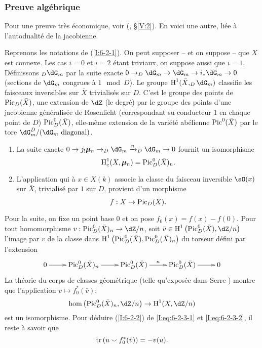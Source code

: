 \subsubsection{Preuve algébrique}\label{I:6-2-3}

Pour une preuve très économique, voir (, \S\ref{V:2}). 
En voici une autre, liée à l'autodualité de la jacobienne. 

Reprenons les notations de (\ref{I:6-2-1}). On peut supposer -- et on suppose -- 
que $X$ est connexe. Les cas $i=0$ et $i=2$ étant triviaux, on suppose aussi 
que $i=1$. Définissons $_D\dG_m$ par la suite exacte 
$0\to _D\dG_m \to \dG_m \to i_*\dG_m\to 0$ (sections de $\dG_m$ congrues à 
$1\mod D$). Le groupe $\h^1(\bar X, _D\dG_m)$ classifie les faisceaux 
inversibles sur $\bar X$ trivialisés sur $D$. C'est le groupe des points de 
$\operatorname{Pic}_D(\bar X)$, une extension de $\dZ$ (le degré) par le groupe des points 
d'une jacobienne généralisée de Rosenlicht (correspondant su conducteur 
$1$ en chaque point de $D$) $\operatorname{Pic}_D^0(\bar X)$, elle-même extension de la 
variété abélienne $\operatorname{Pic}^0(\bar X)$ par le tore 
$\dG_m^D/(\text{$\dG_m$ diagonal})$. 

\begin{enumerate}[\indent a)]
  \item La suite exacte 
    $0\to j_!\dmu_n \to _D\dG_m \xrightarrow{n} _D\dG_m\to 0$ fournit un 
    isomorphisme 
    \begin{equation}\label{I:eq:6-2-3-1}
      \operatorname{H}_c^1(X,{\bm\mu}_n) = \operatorname{Pic}_D^0(\bar X)_n \text{.}
    \end{equation}
  \item L'application qui à $x\in X(k)$ associe la classe du faisceau 
    inversible $\sO(x)$ sur $\bar X$, trivialisé par $1$ sur $D$, provient 
    d'un morphisme 
    \[
      f:X \to \operatorname{Pic}_D(\bar X) \text{.}
    \]
\end{enumerate}
Pour la suite, on fixe un point base $0$ et on pose $f_0(x)=f(x)-f(0)$. Pour 
tout homomorphisme $v:\pic_D^0(\bar X)_n \to \dZ/n$, soit 
$\bar v\in \h^1\left(\pic_D^0(\bar X),\dZ/n\right)$ l'image par $v$ de la classe 
dans $\operatorname{H}^1\left(\operatorname{Pic}_D^0(\bar X),\operatorname{Pic}_D^0(\bar X)_n\right)$ du torseur défini 
par l'extension 
\[\xymatrix{
  0 \ar[r] 
    & \pic_D^0(\bar X)_n \ar[r] 
    & \pic_D^0(\bar X) \ar[r]^-n 
    & \pic_D^0(\bar X) \ar[r] 
    & 0
}\]
La théorie du corps de classes géométrique (telle qu'exposée dans 
Serre \cite{se59}) montre que l'application $v\mapsto f_0^*(\bar v)$: 
\begin{equation}\label{I:eq:6-2-3-2}
  \hom\left(\pic_D^0(\bar X)_n,\dZ/n\right) \to \h^1(X,\dZ/n)
\end{equation}
est un isomorphisme. Pour déduire (\ref{I:6-2-2}) de \eqref{I:eq:6-2-3-1} et 
\eqref{I:eq:6-2-3-2}, il reste à savoir que 
\begin{equation}\label{I:eq:6-2-3-3}
  \operatorname{tr}\left(u \smallsmile f_0^*(\bar v)\right) = -v(u) \text{.}
\end{equation}

